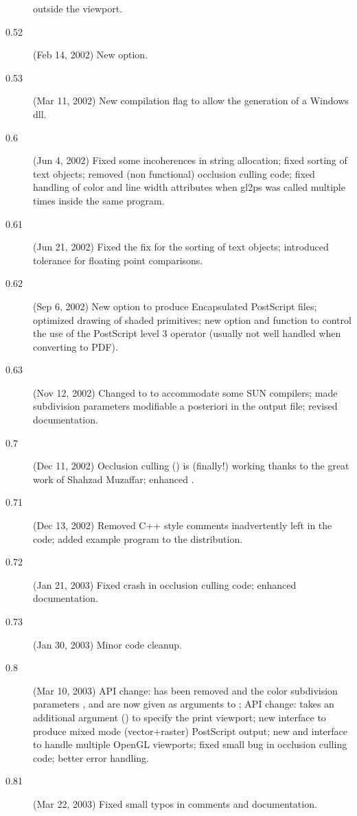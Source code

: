 \begin{description}
  outside the viewport.
\item[0.52] (Feb 14, 2002) New  option.
\item[0.53] (Mar 11, 2002) New  compilation flag to allow the
  generation of a Windows dll.
\item[0.6] (Jun 4, 2002) Fixed some incoherences in string allocation; fixed
  sorting of text objects; removed (non functional) occlusion culling code;
  fixed handling of color and line width attributes when gl2ps was called
  multiple times inside the same program.
\item[0.61] (Jun 21, 2002) Fixed the fix for the sorting of text objects;
  introduced tolerance for floating point comparisons.
\item[0.62] (Sep 6, 2002) New  option to produce Encapsulated
  PostScript files; optimized drawing of shaded primitives; new
   option and  function to
  control the use of the PostScript level 3  operator (usually
  not well handled when converting to PDF).
\item[0.63] (Nov 12, 2002) Changed  to  to accommodate
  some SUN compilers; made subdivision parameters modifiable a posteriori in
  the output file; revised documentation.
\item[0.7] (Dec 11, 2002) Occlusion culling () is
  (finally!) working thanks to the great work of Shahzad Muzaffar; enhanced
  .
\item[0.71] (Dec 13, 2002) Removed C++ style comments inadvertently left in
  the code; added example program  to the distribution.
\item[0.72] (Jan 21, 2003) Fixed crash in occlusion culling code; enhanced
  documentation.
\item[0.73] (Jan 30, 2003) Minor code cleanup.
\item[0.8] (Mar 10, 2003) API change:  has been
  removed and the color subdivision parameters ,  and 
  are now given as arguments to ; API change:
   takes an additional argument () to
  specify the print viewport; new  interface to produce
  mixed mode (vector+raster) PostScript output; new 
  and  interface to handle multiple OpenGL viewports;
  fixed small bug in occlusion culling code; better error handling.
\item[0.81] (Mar 22, 2003) Fixed small typos in comments and documentation.

\end{description}
